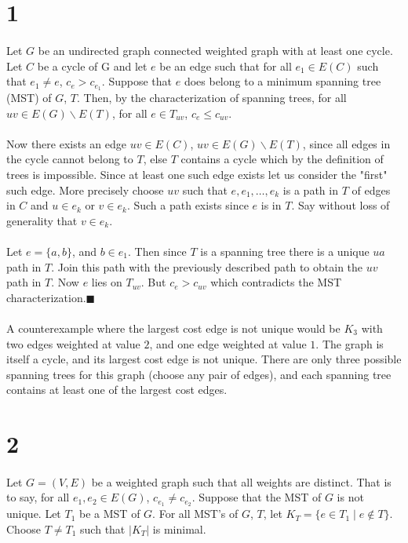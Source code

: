\documentclass[letterpaper,12pt,oneside,onecolumn]{report}
\begin{document}
\section*{1}
\paragraph{}
Let $G$ be an undirected graph connected weighted graph with at least one cycle. Let $C$ be a cycle of G and let $e$ be an edge such that for all $e_1 \in E(C)$ such that $e_1 \neq e$, $c_e >  c_{e_1}$. Suppose that $e$ does belong to a minimum spanning tree (MST) of $G$, $T$. Then, by the characterization of spanning trees, for all $uv \in E(G) \backslash E(T)$, for all $e \in T_{uv}$, $c_e \leq c_{uv}$. 
\paragraph{}
Now there exists an edge $uv \in E(C)$, $uv \in E(G) \backslash E(T)$, since all edges in the cycle cannot belong to $T$, else $T$ contains a cycle which by the definition of trees is impossible. Since at least one such edge exists let us consider the "first" such edge. More precisely choose $uv$ such that $e,e_1,\dots,e_k$ is a path in $T$ of edges in $C$ and $u \in e_k$ or $v \in e_k$. Such a path exists since $e$ is in $T$. Say without loss of generality that $v \in e_k$.
\paragraph{}
Let $e=\{a,b\}$, and $b \in e_1$. Then since $T$ is a spanning tree there is a unique $ua$ path in $T$. Join this path with the previously described path to obtain the $uv$ path in $T$. Now $e$ lies on $T_{uv}$. But $c_e > c_{uv}$ which contradicts the MST characterization.$\blacksquare$ 
\paragraph{}
A counterexample where the largest cost edge is not unique would be $K_3$ with two edges weighted at value $2$, and one edge weighted at value $1$. The graph is itself a cycle, and its largest cost edge is not unique. There are only three possible spanning trees for this graph (choose any pair of edges), and each spanning tree contains at least one of the largest cost edges.
\section*{2}
\paragraph{}
Let $G=(V,E)$ be a weighted graph such that all weights are distinct. That is to say, for all $e_1, e_2 \in E(G)$, $c_{e_1} \neq c_{e_2}$. Suppose that the MST of $G$ is not unique. Let $T_1$ be a MST of $G$. For all MST's of $G$, $T$, let $K_T = \{ e \in T_1 \mid e \not\in T \}$. Choose $T \neq T_1$ such that $|K_T|$ is minimal.
\end{document}
